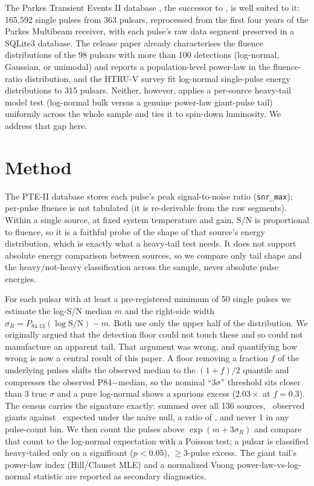 \documentclass[twocolumn]{aastex631}
\newcommand{\code}[1]{\texttt{#1}}
\begin{document}
The Parkes Transient Events II database \citep[PTE-II;][]{yang2025}, the successor to
\citet{zhang2020}, is well suited to it: 165{,}592 single pulses from 363 pulsars, reprocessed from
the first four years of the Parkes Multibeam receiver, with each pulse's raw data segment preserved
in a SQLite3 database. The release paper already characterises the fluence distributions of the 98
pulsars with more than 100 detections (log-normal, Gaussian, or unimodal) and reports a
population-level power-law in the fluence-ratio distribution, and the HTRU-V survey
\citep{burkespolaor2012} fit log-normal single-pulse energy distributions to 315 pulsars. Neither,
however, applies a per-source heavy-tail model test (log-normal bulk versus a genuine
power-law giant-pulse tail) uniformly across the whole sample and ties it to spin-down luminosity.
We address that gap here.

\section{Method}
\label{sec:method}
The PTE-II database stores each pulse's peak signal-to-noise ratio
(\code{snr\_max}); per-pulse fluence is not tabulated (it is re-derivable from the raw
segments). Within a single source, at fixed system temperature and gain, S/N is proportional to
fluence, so it is a faithful probe of the shape of that source's energy distribution, which
is exactly what a heavy-tail test needs. It does not support absolute energy comparison between
sources, so we compare only tail shape and the heavy/not-heavy classification across the sample, never
absolute pulse energies.

For each pulsar with at least a pre-registered minimum of 50
single pulses we estimate the log-S/N median $m$ and the right-side width
$\sigma_R = P_{84.13}(\log \mathrm{S/N}) - m$. Both use only the upper half of the distribution.
We originally argued that the detection floor could not touch these and so could not
manufacture an apparent tail. That argument was wrong, and quantifying how wrong is
now a central result of this paper. A floor removing a fraction $f$ of the underlying pulses
shifts the observed median to the $(1{+}f)/2$ quantile and compresses the observed
P84$-$median, so the nominal ``3$\sigma$'' threshold sits closer than 3 true $\sigma$ and a
pure log-normal shows a spurious excess ($2.03\times$ at $f=0.3$). The census carries
the signature exactly: summed over all 136 sources, \ptStatSumGiant\ observed giants against
\ptStatSumExp\ expected under the naive null, a ratio of \ptStatAggRatio, and never 1 in
any pulse-count bin. We then count the pulses above
$\exp(m + 3\sigma_R)$ and compare that count to the log-normal expectation with a Poisson test; a
pulsar is classified heavy-tailed only on a significant ($p<0.05$), $\ge 3$-pulse excess. The
giant tail's power-law index (Hill/Clauset MLE) and a normalized Vuong power-law-vs-log-normal
statistic \citep{clauset2009} are reported as secondary diagnostics.
\end{document}
